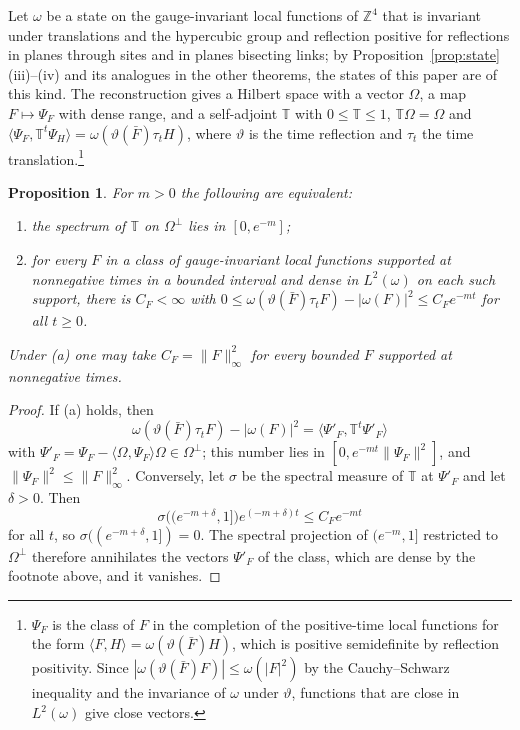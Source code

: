 \documentclass[aps,prd,twocolumn,superscriptaddress,nofootinbib,longbibliography,floatfix,amsmath,amssymb,10pt]{revtex4-2}
\newtheorem{proposition}[theorem]{Proposition}
\theoremstyle{definition}
\theoremstyle{remark}
\newcommand{\Z}{\mathbb{Z}}
\newcommand{\ip}[2]{\langle #1,#2\rangle}
\begin{document}
Let $\omega$ be a state on the gauge-invariant local functions of $\Z^4$ that
is invariant under translations and the hypercubic group and reflection
positive for reflections in planes through sites and in planes bisecting
links; by Proposition~\ref{prop:state}(iii)--(iv) and its analogues in the
other theorems, the states of this paper are of this kind. The reconstruction gives a Hilbert space with a
vector $\Omega$, a map $F\mapsto\Psi_F$ with dense range, and a self-adjoint
$\mathbb T$ with $0\le\mathbb T\le1$, $\mathbb T\Omega=\Omega$ and
$\ip{\Psi_F}{\mathbb T^t\Psi_H}=\omega(\vartheta(\bar F)\tau_tH)$, where
$\vartheta$ is the time reflection and $\tau_t$ the time
translation.\footnote{$\Psi_F$ is the class of $F$ in the completion of the
positive-time local functions for the form $\ip FH=\omega(\vartheta(\bar F)H)$,
which is positive semidefinite by reflection positivity. Since
$|\omega(\vartheta(\bar F)F)|\le\omega(|F|^2)$ by the Cauchy--Schwarz
inequality and the invariance of $\omega$ under $\vartheta$, functions that are
close in $L^2(\omega)$ give close vectors.}

\begin{proposition}\label{prop:gapdecay}
For $m>0$ the following are equivalent:
\begin{enumerate}[label=\textup{(\alph*)},leftmargin=*]
\item the spectrum of $\mathbb T$ on $\Omega^\perp$ lies in $[0,e^{-m}]$;
\item for every $F$ in a class of gauge-invariant local functions supported
at nonnegative times in a bounded interval and dense in $L^2(\omega)$ on each such support,
there is $C_F<\infty$ with $0\le\omega(\vartheta(\bar F)\tau_tF)-|\omega(F)|^2
\le C_Fe^{-mt}$ for all $t\ge0$.
\end{enumerate}
Under \textup{(a)} one may take $C_F=\|F\|_\infty^2$ for every bounded $F$ supported at nonnegative times.
\end{proposition}

\begin{proof}
If (a) holds, then
\[
\omega(\vartheta(\bar F)\tau_tF)-|\omega(F)|^2=\ip{\Psi'_F}{\mathbb
T^t\Psi'_F}
\]
with $\Psi'_F=\Psi_F-\ip\Omega{\Psi_F}\Omega\in\Omega^\perp$; this number lies
in $[0,e^{-mt}\|\Psi_F\|^2]$, and $\|\Psi_F\|^2\le\|F\|_\infty^2$.
Conversely, let $\sigma$ be the spectral measure of $\mathbb T$ at
$\Psi'_F$ and let $\delta>0$. Then
\[
\sigma\bigl((e^{-m+\delta},1]\bigr)e^{(-m+\delta)t}\le C_Fe^{-mt}
\]
for all $t$, so $\sigma((e^{-m+\delta},1])=0$.
The spectral projection of $(e^{-m},1]$ restricted to $\Omega^\perp$ therefore
annihilates the vectors $\Psi'_F$ of the class, which are dense by the
footnote above, and it vanishes.
\end{proof}
\end{document}
